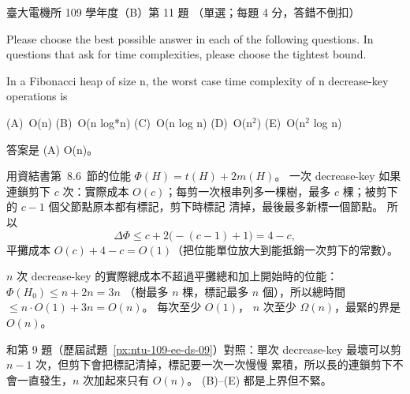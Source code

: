 \begin{pastexam}[label={px:ntu-109-ee-ds-11}]{臺大電機所 109 學年度（B）第 11 題}
（單選；每題 4 分，答錯不倒扣）

Please choose the best possible answer in each of the following questions. In questions that ask
for time complexities, please choose the tightest bound.

In a Fibonacci heap of size n, the worst case time complexity of n decrease-key operations is

(A)~O(n) \qquad (B)~O(n log*n) \qquad (C)~O(n log n) \qquad (D)~O(n$^2$) \qquad (E)~O(n$^2$ log n)
\end{pastexam}

\begin{pastsoln}
答案是 (A) O(n)。

用資結書第~8.6~節的位能 $\Phi(H) = t(H) + 2m(H)$。 一次 decrease-key 如果連鎖剪下 $c$ 次：實際成本
$O(c)$；每剪一次根串列多一棵樹，最多 $c$ 棵；被剪下的 $c - 1$ 個父節點原本都有標記，剪下時標記
清掉，最後最多新標一個節點。 所以
\[
\Delta\Phi \le c + 2\bigl(-(c - 1) + 1\bigr) = 4 - c,
\]
平攤成本 $O(c) + 4 - c = O(1)$（把位能單位放大到能抵銷一次剪下的常數）。

$n$ 次 decrease-key 的實際總成本不超過平攤總和加上開始時的位能：$\Phi(H_0) \le n + 2n = 3n$
（樹最多 $n$ 棵，標記最多 $n$ 個），所以總時間 $\le n \cdot O(1) + 3n = O(n)$。 每次至少 $O(1)$，
$n$ 次至少 $\Omega(n)$，最緊的界是 $O(n)$。

和第 9 題（歷屆試題~\ref{px:ntu-109-ee-ds-09}）對照：單次 decrease-key 最壞可以剪 $n - 1$ 次，但剪下會把標記清掉，標記要一次一次慢慢
累積，所以長的連鎖剪下不會一直發生，$n$ 次加起來只有 $O(n)$。 (B)--(E) 都是上界但不緊。
\end{pastsoln}
